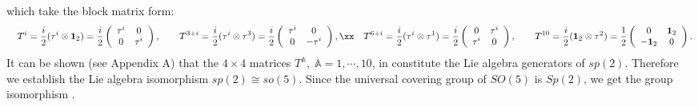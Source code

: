 \documentclass[12pt,epsf]{article}
\begin{document}
which take the block matrix form:
\begin{eqnarray} \label{tabcd}
&& T^{i} = \frac{i}{2} (\tau^i \otimes \mathbf{1}_2) = \frac{i}{2} \left(
                                   \begin{array}{cc}
                                     \tau^i & 0 \\
                                     0 & \tau^i \\
                                   \end{array}
                                 \right), \qquad
T^{3+i} = \frac{i}{2} (\tau^i \otimes \tau^3) = \frac{i}{2} \left(
                                   \begin{array}{cc}
                                     \tau^i & 0 \\
                                     0 & - \tau^i \\
                                   \end{array}
                                 \right), \xx
 && T^{6+i} = \frac{i}{2} (\tau^i \otimes \tau^1) = \frac{i}{2} \left(
                                   \begin{array}{cc}
                                     0 & \tau^i \\
                                     \tau^i & 0 \\
                                   \end{array}
                                 \right), \qquad
T^{10} = \frac{i}{2} (\mathbf{1}_2 \otimes \tau^2) = \frac{1}{2} \left(
                                   \begin{array}{cc}
                                     0 & \mathbf{1}_2 \\
                                     - \mathbf{1}_2 & 0 \\
                                   \end{array}
                                 \right).
\end{eqnarray}
It can be shown (see Appendix A) that the $4 \times 4$ matrices $T^\mathbb{A}, \; \mathbb{A} = 1, \cdots, 10$, in 
constitute the Lie algebra generators of $sp(2)$. Therefore we establish the Lie algebra isomorphism $sp(2) \cong so(5)$.
Since the universal covering group of $SO(5)$ is $Sp(2)$, we get the group isomorphism .
\end{document}
